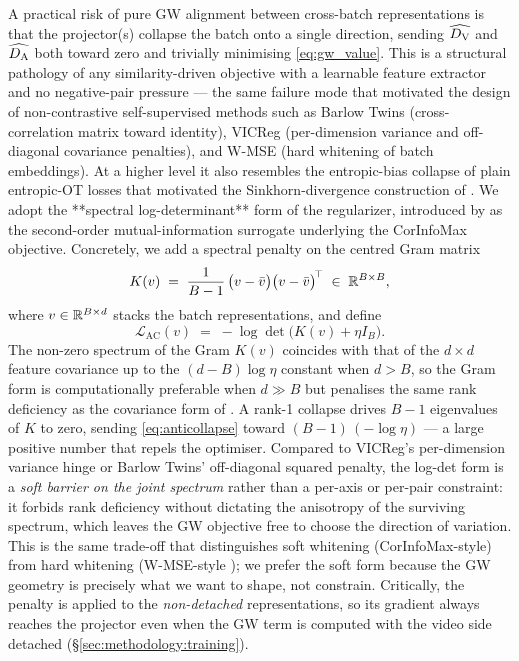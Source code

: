 A practical risk of pure GW alignment between cross-batch
representations is that the projector(s) collapse the batch onto
a single direction, sending $\widehat{D_{\mathrm{V}}}$ and $\widehat{D_{\mathrm{A}}}$ both
toward zero and trivially minimising \eqref{eq:gw_value}. This is
a structural pathology of any similarity-driven objective with a
learnable feature extractor and no negative-pair pressure --- the
same failure mode that motivated the design of non-contrastive
self-supervised methods such as Barlow Twins
\citep{zbontar_2021_barlow} (cross-correlation matrix toward
identity), VICReg \citep{bardes_2022_vicreg} (per-dimension
variance and off-diagonal covariance penalties), and W-MSE
\citep{ermolov_2021_whitening} (hard whitening of batch
embeddings). At a higher level it also resembles the
entropic-bias collapse of plain entropic-OT losses that motivated
the Sinkhorn-divergence construction of
\citet{feydy_2019_interpolating}. We adopt the **spectral
log-determinant** form of the regularizer, introduced by
\citet{ozsoy_2022_corinfomax} as the second-order
mutual-information surrogate underlying the CorInfoMax objective.
Concretely, we add a spectral penalty on the centred Gram matrix
\begin{equation}
  K(v) \;=\; \frac{1}{B-1}\,\bigl(v - \bar v\bigr)\bigl(v - \bar v\bigr)^{\!\top}
  \;\in\; \mathbb{R}^{B \times B},
  \label{eq:gram}
\end{equation}
where $v \in \mathbb{R}^{B \times d}$ stacks the batch representations,
and define
\begin{equation}
  \mathcal{L}_{\mathrm{AC}}(v)
  \;=\;
  -\log\det\bigl(K(v) + \eta I_B\bigr).
  \label{eq:anticollapse}
\end{equation}
The non-zero spectrum of the Gram $K(v)$ coincides with that of the
$d \times d$ feature covariance up to the $(d - B)\log\eta$
constant when $d > B$, so the Gram form is computationally
preferable when $d \gg B$ but penalises the same rank deficiency
as the covariance form of \citet{ozsoy_2022_corinfomax}.
A rank-1 collapse drives $B-1$ eigenvalues of $K$ to zero, sending
\eqref{eq:anticollapse} toward $(B-1)\,(-\log\eta)$ — a large
positive number that repels the optimiser. Compared to VICReg's
per-dimension variance hinge or Barlow Twins' off-diagonal squared
penalty, the log-det form is a \emph{soft barrier on the joint
spectrum} rather than a per-axis or per-pair constraint: it forbids
rank deficiency without dictating the anisotropy of the surviving
spectrum, which leaves the GW objective free to choose the
direction of variation. This is the same trade-off that
distinguishes soft whitening (CorInfoMax-style) from hard
whitening (W-MSE-style \citep{ermolov_2021_whitening}); we prefer
the soft form because the GW geometry is precisely what we want to
shape, not constrain. Critically, the penalty is applied to the
\emph{non-detached} representations, so its gradient always reaches
the projector even when the GW term is computed with the video
side detached (\S\ref{sec:methodology:training}).


